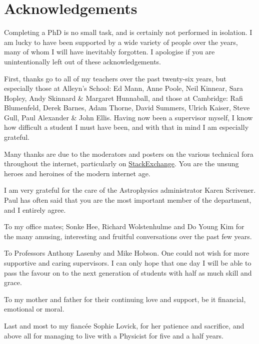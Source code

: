 \chapter{Acknowledgements}
Completing a PhD is no small task, and is certainly not performed in isolation. I am lucky to have been supported by a wide variety of people over the years, many of whom I will have inevitably forgotten. I apologise if you are unintentionally left out of these acknowledgements.

First, thanks go to all of my teachers over the past twenty-six years, but especially those at Alleyn's School: Ed Mann, Anne Poole, Neil Kinnear, Sara Hopley, Andy Skinnard \& Margaret Hunnaball, and those at Cambridge: Rafi Blumenfeld, Derek Barnes, Adam Thorne, David Summers, Ulrich Kaiser, Steve Gull, Paul Alexander \& John Ellis. Having now been a supervisor myself, I know how difficult a student I must have been, and with that in mind I am especially grateful.

Many thanks are due to the moderators and posters on the various technical fora throughout the internet, particularly on \mbox{\href{http://stackexchange.com/}{StackExchange}}. You are the unsung heroes and heroines of the modern internet age.

I am very grateful for the care of the Astrophysics administrator Karen Scrivener. Paul has often said that you are the most important member of the department, and I entirely agree.

To my office mates; Sonke Hee, Richard Wolstenhulme and Do Young Kim for the many amusing, interesting and fruitful conversations over the past few years. 

To Professors Anthony Lasenby and Mike Hobson. One could not wish for more supportive and caring supervisors. I can only hope that one day I will be able to pass the favour on to the next generation of students with half as much skill and grace.

To my mother and father for their continuing love and support, be it financial, emotional or moral.

Last and most to my fianc\'{e}e Sophie Lovick, for her patience and sacrifice, and above all for managing to live with a Physicist for five and a half years.
